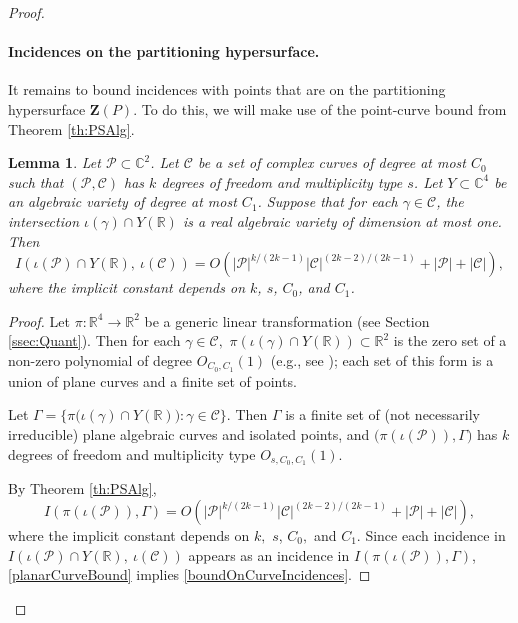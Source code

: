 \documentclass[letterpaper, reqno,11pt]{article}
\newtheorem{lemma}[theorem]{Lemma}
\theoremstyle{remark}
\newcommand{\RR}{\mathbb{R}}
\newcommand{\CC}{\mathbb{C}}
\newcommand{\BZ}{\mathbf{Z}}
\newcommand{\pts}{\mathcal P}
\newcommand{\curves}{\mathcal C}
\begin{document}
\begin{proof}
\paragraph{Incidences on the partitioning hypersurface.}
It remains to bound incidences with points that are on the partitioning hypersurface $\BZ(P)$. To do this, we will make use of the point-curve bound from Theorem \ref{th:PSAlg}.
\begin{lemma}\label{1DcurveIncidenceBd}
Let $\pts\subset\CC^2$. Let $\curves$ be a set of complex curves of degree at most $C_0$ such that $(\pts,\curves)$ has $k$ degrees of freedom and multiplicity type $s$. Let $Y\subset\CC^4$ be an algebraic variety of degree at most $C_1$. Suppose that for each $\gamma\in\curves$, the intersection $\iota(\gamma)\cap Y(\RR)$ is a real algebraic variety of dimension at most one. Then
\begin{equation}\label{boundOnCurveIncidences}
I(\iota(\pts)\cap Y(\RR),\ \iota(\curves))= O(|\pts|^{k/(2k-1)}|\curves|^{(2k-2)/(2k-1)}+|\pts|+|\curves|),
\end{equation}
where the implicit constant depends on $k$, $s$, $C_0$, and $C_1$.
\end{lemma}
\begin{proof}
Let $\pi\colon\RR^4\to\RR^2$ be a generic linear transformation (see Section \ref{ssec:Quant}). Then for each $\gamma\in\curves,$ $\pi(\iota(\gamma)\cap Y(\RR))\subset\RR^2$ is the zero set of a non-zero polynomial of degree $O_{C_0,C_1}(1)$ (e.g., see \cite[Section 5.1]{ST}); each set of this form is a union of plane curves and a finite set of points.

Let $\Gamma=\{\pi\big(\iota(\gamma)\cap Y(\RR)\big)\colon \gamma\in\curves\}$. Then $\Gamma$ is a finite set of (not necessarily irreducible) plane algebraic curves and isolated points, and $\big(\pi(\iota(\pts)),\Gamma\big)$ has $k$ degrees of freedom and multiplicity type $O_{s,C_0,C_1}(1)$.

By Theorem \ref{th:PSAlg},
\begin{equation}\label{planarCurveBound}
I(\pi(\iota(\pts)),\Gamma)=O(|\pts|^{k/(2k-1)}|\curves|^{(2k-2)/(2k-1)}+|\pts|+|\curves|),
\end{equation}
where the implicit constant depends on $k,$ $s$, $C_0,$ and $C_1$. Since each incidence in $I(\iota(\pts)\cap Y(\RR),\ \iota(\curves))$ appears as an incidence in $I(\pi(\iota(\pts)),\Gamma)$, \eqref{planarCurveBound} implies \eqref{boundOnCurveIncidences}.
\end{proof}


\end{proof}
\end{document}
